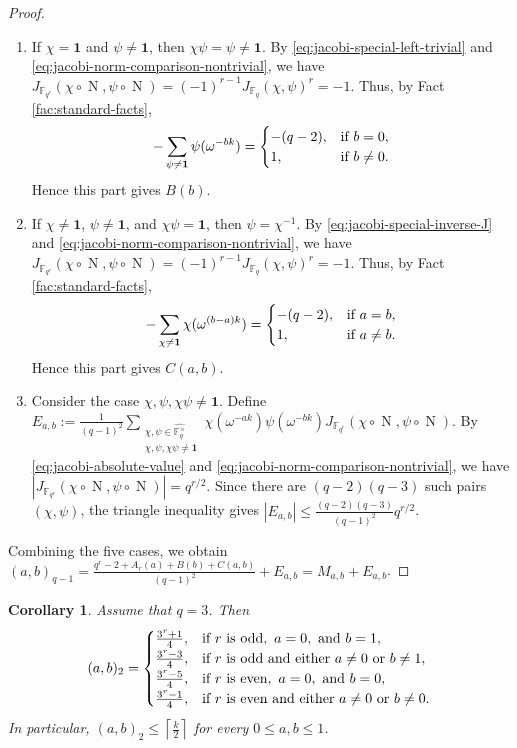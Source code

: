 \documentclass[10pt,a4paper]{article}
\newtheorem{cor}[thm]{Corollary}
\newcommand{\Norm}{\operatorname{N}}
\newcommand{\one}{\mathbf{1}}
\numberwithin{equation}{section}
\begin{document}
\begin{proof}
\begin{enumerate}
\item[\textup{(3)}:]
If $\chi=\one$ and $\psi\neq \one$, then $\chi\psi=\psi\neq \one$. By \eqref{eq:jacobi-special-left-trivial} and \eqref{eq:jacobi-norm-comparison-nontrivial}, we have
$J_{\mathbb{F}_{q^r}}(\chi\circ \Norm,\psi\circ \Norm)=(-1)^{r-1}J_{\mathbb{F}_q}(\chi,\psi)^r=-1$.
Thus, by Fact \ref{fac:standard-facts},
\[
-\sum_{\psi\neq \one}\psi(\omega^{-bk})
=
\begin{cases}
-(q-2), & \textup{if } b=0,\\
1, & \textup{if } b\neq0.
\end{cases}
\]
Hence this part gives $B(b)$.

\item[\textup{(4)}:]
If $\chi\neq \one$, $\psi\neq \one$, and $\chi\psi=\one$, then $\psi=\chi^{-1}$. By \eqref{eq:jacobi-special-inverse-J} and \eqref{eq:jacobi-norm-comparison-nontrivial}, we have
$J_{\mathbb{F}_{q^r}}(\chi\circ \Norm,\psi\circ \Norm)=(-1)^{r-1}J_{\mathbb{F}_q}(\chi,\psi)^r=-1$.
Thus, by Fact \ref{fac:standard-facts},
\[
-\sum_{\chi\neq \one}\chi(\omega^{(b-a)k})
=
\begin{cases}
-(q-2), & \textup{if } a=b,\\
1, & \textup{if } a\neq b.
\end{cases}
\]
Hence this part gives $C(a,b)$.

\item[\textup{(5)}:]
Consider the case $\chi,\psi,\chi\psi\neq \one$. Define
$E_{a,b}:=\frac{1}{(q-1)^2}\sum_{\substack{\chi,\psi\in\widehat{\mathbb{F}_q^\times}\\ \chi,\psi,\chi\psi\neq \one}}\chi(\omega^{-ak})\psi(\omega^{-bk})J_{\mathbb{F}_{q^r}}(\chi\circ \Norm,\psi\circ \Norm)$.
By \eqref{eq:jacobi-absolute-value} and \eqref{eq:jacobi-norm-comparison-nontrivial}, we have
$|J_{\mathbb{F}_{q^r}}(\chi\circ \Norm,\psi\circ \Norm)|=q^{r/2}$.
Since there are $(q-2)(q-3)$ such pairs $(\chi,\psi)$, the triangle inequality gives
$|E_{a,b}|\le \frac{(q-2)(q-3)}{(q-1)^2}q^{r/2}$.
\end{enumerate}
Combining the five cases, we obtain
$(a,b)_{q-1}=\frac{q^r-2+A_r(a)+B(b)+C(a,b)}{(q-1)^2}+E_{a,b}=M_{a,b}+E_{a,b}$.
\end{proof}

\begin{cor}\label{cor:q-three-exact-general}
Assume that $q=3$. Then
\[
(a,b)_2=
\begin{cases}
\frac{3^r+1}{4}, & \textup{if } r \textup{ is odd},\ a=0,\textup{ and } b=1,\\
\frac{3^r-3}{4}, & \textup{if } r \textup{ is odd and either } a\neq0 \textup{ or } b\neq1,\\
\frac{3^r-5}{4}, & \textup{if } r \textup{ is even},\ a=0,\textup{ and } b=0,\\
\frac{3^r-1}{4}, & \textup{if } r \textup{ is even and either } a\neq0 \textup{ or } b\neq0.
\end{cases}
\]
In particular, $(a,b)_2\le \left\lceil \frac{k}{2}\right\rceil$ for every $0\le a,b\le 1$.
\end{cor}
\end{document}
